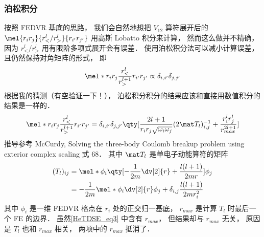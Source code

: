 \subsubsection{泊松积分}
按照 FEDVR 基底的思路， 我们会自然地想把 $V_{12}$ 算符展开后的 $\mel{r_i r_j}{r_<^l/r_>^l}{r_{i'} r_{j'}}$ 用高斯 Lobatto 积分来计算， 然而这么做并不精确， 因为 $r_<^l/r_>^l$ 用有限阶多项式展开会有误差． 使用泊松积分法可以减小计算误差， 且仍然保持对角矩阵的形式， 即
\begin{equation}
\mel*{r_i r_j}{\frac{r_<^l}{r_>^{l+1}}}{r_{i'} r_{j'}} \propto \delta_{i,i'} \delta_{j,j'}
\end{equation}
根据我的猜测（有空验证一下！）， 泊松积分积分的结果应该和直接用数值积分的结果是一样的．
\begin{equation}\label{HeTDSE_eq3}
\mel*{r_i r_j}{\frac{r_<^l}{r_>^{l+1}}}{r_{i'} r_{j'}} = \delta_{i,i'} \delta_{j,j'} \qty[\frac{2l+1}{r_i r_j \sqrt{\omega_i \omega_j}} (2\mat T_l)^{-1}_{i,j} + \frac{r_i^l r_j^l}{r_{max}^{2l+1}}]
\end{equation}
推导参考 McCurdy, Solving the three-body Coulomb breakup problem using exterior complex scaling 式 68． 其中 $\mat T_l$ 是单电子动能算符的矩阵
\begin{equation}
\begin{aligned}
(T_l)_{ij} &= \mel*{\phi_i}{\qty[-\frac{1}{2m}\dv[2]{r} + \frac{l(l+1)}{2mr}]}{\phi_j}\\
&= -\frac{1}{2m} \mel*{\phi_i}{\dv[2]{r}}{\phi_j} + \delta_{i,j}\frac{l(l+1)}{2mr_i^2}
\end{aligned}
\end{equation}
其中 $\phi_i$ 是一维 FEDVR 格点在 $r_i$ 处的正交归一基底， $r_{max}$ 是计算 $T_l$ 时最后一个 FE 的边界． 虽然\autoref{HeTDSE_eq3} 中含有 $r_{max}$， 但结果却与 $r_{max}$ 无关， 原因是 $T_l$ 也和 $r_{max}$ 相关， 两项中的 $r_{max}$ 抵消了．

